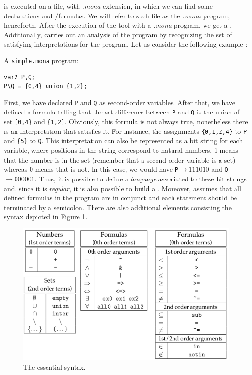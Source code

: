 \MONA is executed on a file, with \textit{.mona} extension, in which we can find some declarations and \wsos/\wsts formulas. We will refer to such file as the \textit{.mona} program, henceforth. After the execution of the tool with a \textit{.mona} program, we get a \DFA. Additionally, \MONA carries out an analysis of the program by recognizing the set of satisfying interpretations for the program. Let us consider the following example \citep{monamanual2001}:
\begin{example}
A \texttt{simple.mona} program:\\
\begin{lstlisting}[style=Mona, escapechar = £]
var2 P,Q;
P\Q = {0,4} union {1,2};
\end{lstlisting}
\end{example}
First, we have declared \texttt{P} and \texttt{Q} as second-order variables. After that, we have defined a formula telling that the set difference between \texttt{P} and \texttt{Q} is the union of set \texttt{\{0,4\}} and \texttt{\{1,2\}}. Obviously, this formula is not always true, nonetheless there is an interpretation that satisfies it. For instance, the assignments \texttt{\{0,1,2,4\}} to \texttt{P} and \texttt{\{5\}} to \texttt{Q}. This interpretation can also be represented as a bit string for each variable, where positions in the string correspond to natural numbers, 1 means that the number is in the set (remember that a second-order variable is a set) whereas 0 means that is not. In this case, we would have \texttt{P}$ \rightarrow 111010$ and \texttt{Q}$ \rightarrow 000001$. Thus, it is possible to define a \textit{language} associated to these bit strings and, since it is \textit{regular}, it is also possible to build a \DFA. Moreover, \MONA assumes that all defined formulas in the program are in conjunct and each statement should be terminated by a semicolon.
There are also additional elements consisting the \MONA syntax depicted in Figure \ref{fig:mona-syntax}.
\begin{figure}[h]
	\centering
	\includegraphics[width=\textwidth]{images/mona-syntax}
	\caption{The essential \MONA syntax.}
	\label{fig:mona-syntax}
\end{figure}

